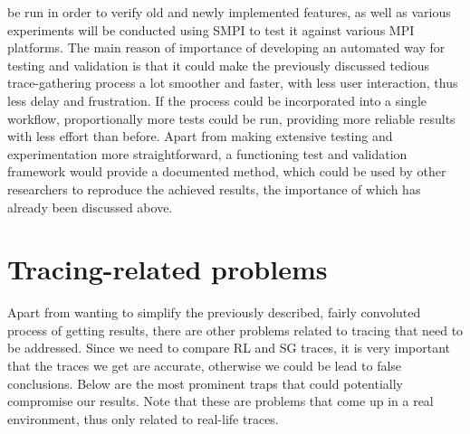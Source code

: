 be run in order to verify old and newly implemented features, as well
as various experiments will be conducted using SMPI to test it against
various MPI platforms. The main reason of importance of developing an
automated way for testing and validation is that it could make the
previously discussed tedious trace-gathering process a lot smoother
and faster, with less user interaction, thus less delay and
frustration. If the process could be incorporated into a single
workflow, proportionally more tests could be run, providing more
reliable results with less effort than before. Apart from making
extensive testing and experimentation more straightforward, a
functioning test and validation framework would provide a
documented method, which could be used by other researchers to
reproduce the achieved results, the importance of which has already
been discussed above.
\section{Tracing-related problems}
Apart from wanting to simplify the previously described, fairly
convoluted process of getting results, there are other problems
related to tracing that need to be addressed. Since we need to compare
RL and SG traces, it is very important that the traces we get are
accurate, otherwise we could be lead to false conclusions. Below are
the most prominent traps that could potentially compromise our
results. Note that these are problems that come up in a real
environment, thus only related to real-life traces.
